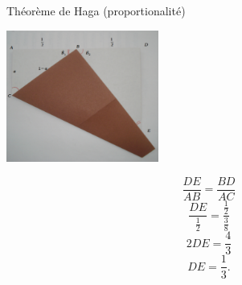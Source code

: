 \documentclass{beamer}
\begin{document}
\begin{frame}{Théorème de Haga (proportionalité)}
    \begin{multicols}{2}

    \begin{center}        
        \includegraphics[width=5cm]{haga_coupe_anote}
    \end{center}

    \begin{equation}
        \frac{ DE }{ AB }=\frac{ BD }{ AC }
    \end{equation}
    \begin{equation}
        \frac{ DE }{ \frac{ 1 }{2} }=\frac{ \frac{ 1 }{2} }{ \frac{ 3 }{ 8 } }
    \end{equation}
    \begin{equation}
        2DE=\frac{ 4 }{ 3 }
    \end{equation}
    \begin{equation}
        DE=\frac{1}{ 3 }.
    \end{equation}
    \end{multicols}

\end{frame}
\end{document}
